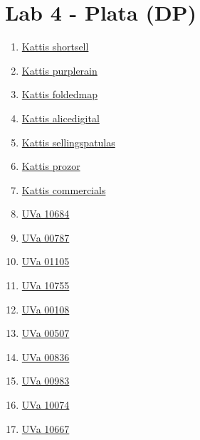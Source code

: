 \section{Lab 4 -  Plata (DP)}
        \begin{enumerate}
\item \href{https://open.kattis.com/problems/shortsell}{Kattis shortsell}
\item \href{https://open.kattis.com/problems/purplerain}{Kattis purplerain}
\item \href{https://open.kattis.com/problems/foldedmap}{Kattis foldedmap}
\item \href{https://open.kattis.com/problems/alicedigital}{Kattis alicedigital}
\item \href{https://open.kattis.com/problems/sellingspatulas}{Kattis sellingspatulas}
\item \href{https://open.kattis.com/problems/prozor}{Kattis prozor}
\item \href{https://open.kattis.com/problems/commercials}{Kattis commercials}
\item \href{https://onlinejudge.org/index.php?option=com_onlinejudge&Itemid=8&page=show_problem&problem=1625}{UVa 10684}
\item \href{https://onlinejudge.org/index.php?option=com_onlinejudge&Itemid=8&page=show_problem&problem=728}{UVa 00787}
\item \href{https://onlinejudge.org/index.php?option=com_onlinejudge&Itemid=8&page=show_problem&problem=3546}{UVa 01105}
\item \href{https://onlinejudge.org/index.php?option=com_onlinejudge&Itemid=8&page=show_problem&problem=1696}{UVa 10755}
\item \href{https://onlinejudge.org/index.php?option=com_onlinejudge&Itemid=8&page=show_problem&problem=44}{UVa 00108}
\item \href{https://onlinejudge.org/index.php?option=com_onlinejudge&Itemid=8&page=show_problem&problem=448}{UVa 00507}
\item \href{https://onlinejudge.org/index.php?option=com_onlinejudge&Itemid=8&page=show_problem&problem=777}{UVa 00836}
\item \href{https://onlinejudge.org/index.php?option=com_onlinejudge&Itemid=8&page=show_problem&problem=924}{UVa 00983}
\item \href{https://onlinejudge.org/index.php?option=com_onlinejudge&Itemid=8&page=show_problem&problem=1015}{UVa 10074}
\item \href{https://onlinejudge.org/index.php?option=com_onlinejudge&Itemid=8&page=show_problem&problem=1608}{UVa 10667}

\end{enumerate}
